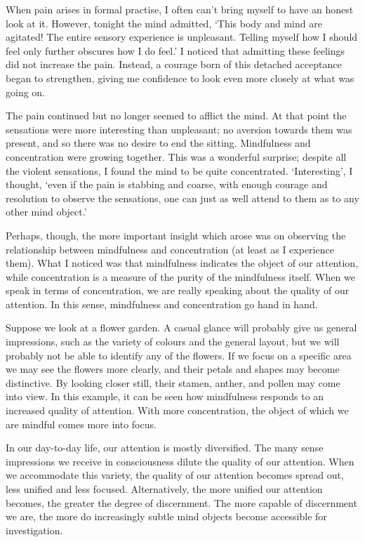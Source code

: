 When pain arises in formal practise, I often can't bring myself to have
an honest look at it. However, tonight the mind admitted, `This body and
mind are agitated! The entire sensory experience is unpleasant. Telling
myself how I should feel only further obscures how I do feel.' I noticed
that admitting these feelings did not increase the pain. Instead, a
courage born of this detached acceptance began to strengthen, giving me
confidence to look even more closely at what
was going on.

The pain continued but no longer seemed to afflict the
mind. At that point the sensations were more interesting than
unpleasant; no aversion towards them was present, and so there was no
desire to end the sitting. Mindfulness and concentration were growing
together. This was a wonderful surprise; despite all the violent
sensations, I found the mind to be quite concentrated. `Interesting', I
thought, `even if the pain is stabbing and coarse, with enough courage
and resolution to observe the sensations, one can just as well attend to
them as to any other mind object.'

Perhaps, though, the more important insight which arose was on observing
the relationship between mindfulness and concentration (at least as I
experience them). What I noticed was that mindfulness indicates the
object of our attention, while concentration is a measure of the purity
of the mindfulness itself. When we speak in terms of concentration, we
are really speaking about the quality of our attention. In this sense, 
mindfulness and concentration go hand in hand. 

Suppose we look at a flower garden. A casual glance will probably give
us general impressions, 
such as the variety of colours and the general layout, but we will
probably not be able to identify any of the flowers. If we focus on a
specific area we may see the flowers more clearly, and their petals and
shapes may become distinctive. By looking closer still, their stamen, 
anther, and pollen may come into view. In this example, it can be seen
how mindfulness responds to an increased quality of attention. With more
concentration, the object of which we are mindful comes more into focus. 

In our day-to-day life, our attention is mostly diversified. The many
sense impressions we receive in consciousness dilute the quality of our
attention. When we accommodate this variety, the quality of our
attention becomes spread out, less unified and less focused. 
Alternatively, the more unified our attention becomes, the greater the
degree of discernment. The more capable of discernment we are, the more
do increasingly subtle mind objects become accessible for investigation. 

